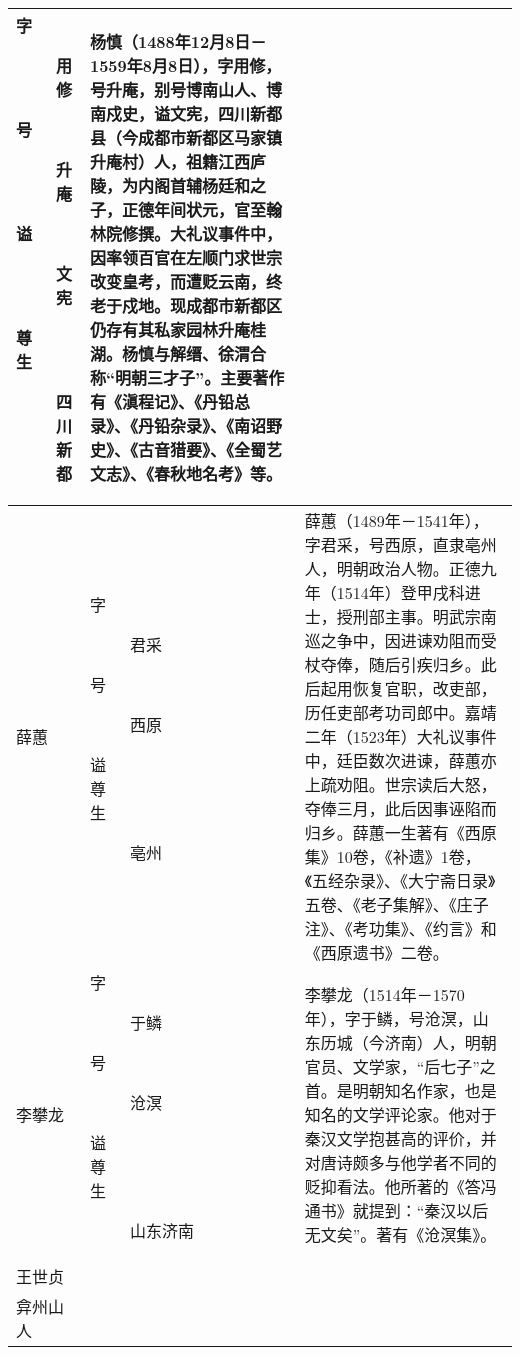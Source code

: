 \begin{longtable}{|>{\centering\namefont\heiti}m{2em}|>{\centering\tiny}m{3.0em}|>{\xzfont\kaiti}m{7.3em}|}
\begin{description}
  \item[字] 用修
  \item[号] 升庵
  \item[谥] 文宪
  \item[尊] 
  \item[生] 四川新都
  \end{description} & 杨慎（1488年12月8日－1559年8月8日），字用修，号升庵，别号博南山人、博南戍史，谥文宪，四川新都县（今成都市新都区马家镇升庵村）人，祖籍江西庐陵，为内阁首辅杨廷和之子，正德年间状元，官至翰林院修撰。大礼议事件中，因率领百官在左顺门求世宗改变皇考，而遭贬云南，终老于戍地。现成都市新都区仍存有其私家园林升庵桂湖。杨慎与解缙、徐渭合称“明朝三才子”。主要著作有《滇程记》、《丹铅总录》、《丹铅杂录》、《南诏野史》、《古音猎要》、《全蜀艺文志》、《春秋地名考》等。 \tabularnewline\hline
  薛蕙 & \begin{description}
  \item[字] 君采
  \item[号] 西原
  \item[谥] 
  \item[尊] 
  \item[生] 亳州
  \end{description} & 薛蕙（1489年－1541年），字君采，号西原，直隶亳州人，明朝政治人物。正德九年（1514年）登甲戌科进士，授刑部主事。明武宗南巡之争中，因进谏劝阻而受杖夺俸，随后引疾归乡。此后起用恢复官职，改吏部，历任吏部考功司郎中。嘉靖二年（1523年）大礼议事件中，廷臣数次进谏，薛蕙亦上疏劝阻。世宗读后大怒，夺俸三月，此后因事诬陷而归乡。薛蕙一生著有《西原集》10卷，《补遗》1卷，《五经杂录》、《大宁斋日录》五卷、《老子集解》、《庄子注》、《考功集》、《约言》和《西原遗书》二卷。 \tabularnewline\hline
  李攀龙 & \begin{description}
  \item[字] 于鳞
  \item[号] 沧溟
  \item[谥] 
  \item[尊] 
  \item[生] 山东济南
  \end{description} & 李攀龙（1514年－1570年），字于鳞，号沧溟，山东历城（今济南）人，明朝官员、文学家，“后七子”之首。是明朝知名作家，也是知名的文学评论家。他对于秦汉文学抱甚高的评价，并对唐诗颇多与他学者不同的贬抑看法。他所著的《答冯通书》就提到：“秦汉以后无文矣”。著有《沧溟集》。 \tabularnewline\hline
  王世贞 & \begin{description}
  \item[字] 元美
  \item[号] 凤洲\\弇州山人

\end{description}
\end{longtable}
